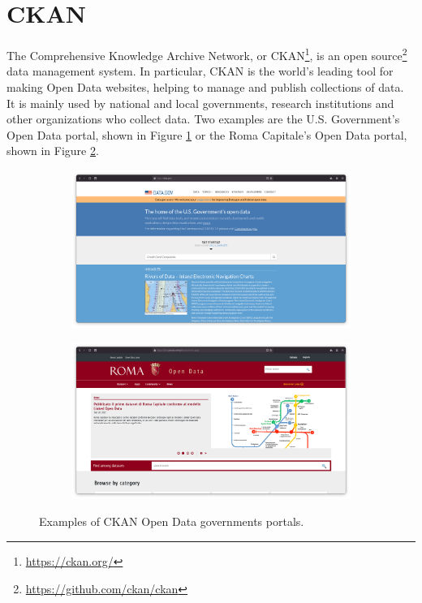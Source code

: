 \section{CKAN}
\label{sec:ckan}

The Comprehensive Knowledge Archive Network, or CKAN\footnote{\url{https://ckan.org/}}, is an open source\footnote{\url{https://github.com/ckan/ckan}} data management system. In particular, CKAN is the world's leading tool for making Open Data websites, helping to manage and publish collections of data. It is mainly used by national and local governments, research institutions and other organizations who collect data. Two examples are the U.S. Government's Open Data portal, shown in Figure \ref{fig:ckan-usa} or the Roma Capitale's Open Data portal, shown in Figure \ref{fig:ckan-roma}.

\begin{figure}[!ht]
  \begin{subfigure}{.5\columnwidth}
    \centering
    \includegraphics[width=.99\linewidth]{images/ckan/ckan-usa}
    \label{fig:ckan-usa}
  \end{subfigure}%
  \begin{subfigure}{.5\columnwidth}
    \centering
    \includegraphics[width=.99\linewidth]{images/ckan/ckan-roma}
    \label{fig:ckan-roma}
  \end{subfigure}
  \caption{Examples of CKAN Open Data governments portals.}
  \label{fig:ckan-examples}
\end{figure}

